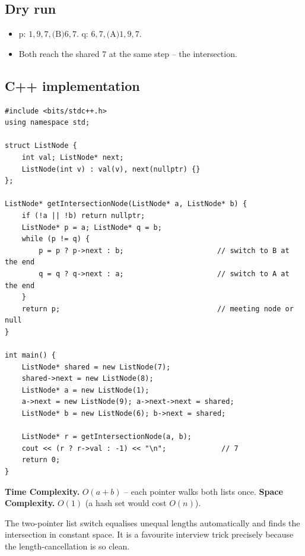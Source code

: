 \subsection*{Dry run}


\begin{itemize}
  \item p: $1,9,7,\text{(B)}6,7$. q: $6,7,\text{(A)}1,9,7$.
  \item Both reach the shared $7$ at the same step -- the intersection.
\end{itemize}

\subsection*{C++ implementation}

\begin{lstlisting}
#include <bits/stdc++.h>
using namespace std;

struct ListNode {
    int val; ListNode* next;
    ListNode(int v) : val(v), next(nullptr) {}
};

ListNode* getIntersectionNode(ListNode* a, ListNode* b) {
    if (!a || !b) return nullptr;
    ListNode* p = a; ListNode* q = b;
    while (p != q) {
        p = p ? p->next : b;                      // switch to B at the end
        q = q ? q->next : a;                      // switch to A at the end
    }
    return p;                                     // meeting node or null
}

int main() {
    ListNode* shared = new ListNode(7);
    shared->next = new ListNode(8);
    ListNode* a = new ListNode(1);
    a->next = new ListNode(9); a->next->next = shared;
    ListNode* b = new ListNode(6); b->next = shared;

    ListNode* r = getIntersectionNode(a, b);
    cout << (r ? r->val : -1) << "\n";             // 7
    return 0;
}
\end{lstlisting}

\begin{complexitybox}
\textbf{Time Complexity.} $O(a+b)$ -- each pointer walks both lists once.
\textbf{Space Complexity.} $O(1)$ (a hash set would cost $O(n)$).
\end{complexitybox}

\begin{takeawaybox}
The two-pointer list switch equalises unequal lengths automatically and
finds the intersection in constant space. It is a favourite interview
trick precisely because the length-cancellation is so clean.
\end{takeawaybox}
